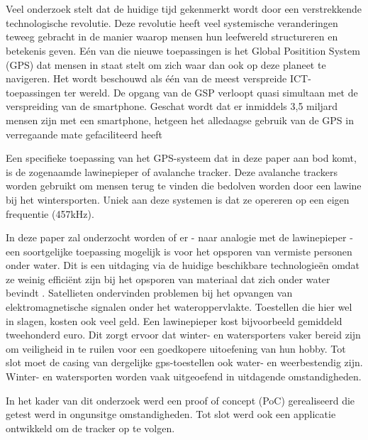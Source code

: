 
\chapter{}
\label{ch:inleiding}
Veel onderzoek stelt dat de huidige tijd gekenmerkt wordt door een verstrekkende technologische revolutie. Deze revolutie heeft veel systemische veranderingen teweeg gebracht in de manier waarop mensen hun leefwereld structureren en betekenis geven. Eén van die nieuwe toepassingen is het Global Positition System (GPS) dat mensen in staat stelt om zich waar dan ook op deze planeet te navigeren. Het wordt beschouwd als één van de meest verspreide ICT-toepassingen ter wereld. De opgang van de GSP verloopt quasi simultaan met de verspreiding van de smartphone. Geschat wordt dat er inmiddels 3,5 miljard mensen zijn met een smartphone, hetgeen het alledaagse gebruik van de GPS in verregaande mate gefaciliteerd heeft \autocite{numberOfSmartphones}

Een specifieke toepassing van het GPS-systeem dat in deze paper aan bod komt, is de zogenaamde lawinepieper of avalanche tracker. Deze avalanche trackers worden gebruikt om mensen terug te vinden die bedolven worden door een lawine bij het wintersporten. Uniek aan deze systemen is dat ze opereren op een eigen frequentie (457kHz).

In deze paper zal onderzocht worden of er - naar analogie met de lawinepieper - een soortgelijke toepassing mogelijk is voor het opsporen van vermiste personen onder water. Dit is een uitdaging via de huidige beschikbare technologieën omdat ze weinig efficiënt zijn bij het opsporen van materiaal dat zich onder water bevindt \autocite{underwaterProblem}. Satellieten ondervinden problemen bij het opvangen van elektromagnetische signalen onder het wateroppervlakte. Toestellen die hier wel in slagen, kosten ook veel geld. Een lawinepieper kost bijvoorbeeld gemiddeld tweehonderd euro. Dit zorgt ervoor dat winter- en watersporters vaker bereid zijn om veiligheid in te ruilen voor een goedkopere uitoefening van hun hobby. Tot slot moet de casing van dergelijke gps-toestellen ook water- en weerbestendig zijn. Winter- en watersporten worden vaak uitgeoefend in uitdagende omstandigheden.

In het kader van dit onderzoek werd een proof of concept (PoC) gerealiseerd die getest werd in ongunsitge omstandigheden. Tot slot werd ook een applicatie ontwikkeld om de tracker op te volgen.


